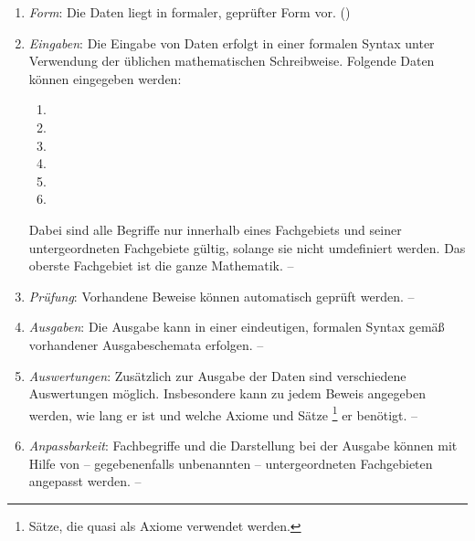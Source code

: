 %
\begin{enumerate}

	\item \label{Anforderung:Form} \emph{Form}:
	Die Daten liegt in formaler, geprüfter Form vor.
	()

	\item \label{Anforderung:Eingaben} \emph{Eingaben}:
	Die Eingabe von Daten erfolgt in einer formalen Syntax unter Verwendung der üblichen mathematischen Schreibweise.
	Folgende Daten können eingegeben werden:
	\begin{enumerate}
		\item {}
		\item {}
		\item {}
		\item {}
		\item {}
		\item {}
	\end{enumerate}
	Dabei sind alle Begriffe nur innerhalb eines Fachgebiets und seiner untergeordneten Fachgebiete gültig, solange sie nicht umdefiniert werden.
	Das oberste Fachgebiet ist die ganze Mathematik.
	-- 

	\item \label{Anforderung:Prüfung} \emph{Prüfung}:
	Vorhandene Beweise können automatisch geprüft werden. 
	-- 

	\item \label{Anforderung:Ausgaben} \emph{Ausgaben}:
	Die Ausgabe kann in einer eindeutigen, formalen Syntax gemäß vorhandener Ausgabeschemata erfolgen. 
	-- 

	\item \label{Anforderung:Auswertungen} \emph{Auswertungen}:
	Zusätzlich zur Ausgabe der Daten sind verschiedene Auswertungen möglich.
	Insbesondere kann zu jedem Beweis angegeben werden, wie lang er ist und welche Axiome und Sätze%
	\footnote {Sätze, die quasi als Axiome verwendet werden.}
	er benötigt. 
	-- 

	\item \label{Anforderung:Anpassbarkeit} \emph{Anpassbarkeit}:
	Fachbegriffe und die Darstellung bei der Ausgabe können mit Hilfe von -- gegebenenfalls unbenannten -- untergeordneten Fachgebieten angepasst werden. 
	-- 


\end{enumerate}
